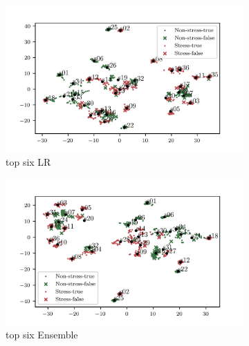 \documentclass[pdflatex,sn-mathphys]{sn-jnl}%
\theoremstyle{thmstyleone}%
\theoremstyle{thmstyletwo}%
\theoremstyle{thmstylethree}%
\begin{document}
\begin{figure}[h!]
    \caption{The top six and top eight features from $\text{Rank}_{\text{LR}}$ and $\text{Rank}_{\text{Ensemble}}$ plot in t-SNE space.}
    \label{fig:t-SNE_lr-ensemble}
    
    \centering
    \begin{subfigure}[b]{0.49\textwidth}
        \centering
        \includegraphics[width=\textwidth]{figures/t-sne-lr-6.png}
        \caption{top six LR}
    \end{subfigure}
    \hfill
    \begin{subfigure}[b]{0.49\textwidth}
        \centering
        \includegraphics[width=\textwidth]{figures/t-sne-ensemble-6.png}
        \caption{top six Ensemble}
    \end{subfigure}
    \\
    \begin{subfigure}[b]{0.49\textwidth}
        \centering

\end{subfigure}
\end{figure}
\end{document}

